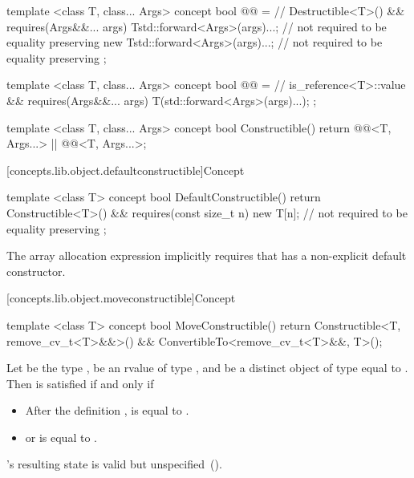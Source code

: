 %
\begin{itemdecl}
template <class T, class... Args>
concept bool @@ = // \expos
  Destructible<T>() && requires(Args&&... args) {
    T{std::forward<Args>(args)...}; // not required to be equality preserving
    new T{std::forward<Args>(args)...}; // not required to be equality preserving
  };

template <class T, class... Args>
concept bool @@ = // \expos
  is_reference<T>::value && requires(Args&&... args) {
    T(std::forward<Args>(args)...);
  };

template <class T, class... Args>
concept bool Constructible() {
  return @@<T, Args...> ||
    @@<T, Args...>;
}
\end{itemdecl}

[concepts.lib.object.defaultconstructible]{Concept }

%
\begin{itemdecl}
template <class T>
concept bool DefaultConstructible() {
  return Constructible<T>() &&
    requires(const size_t n) {
      new T[n]{}; // not required to be equality preserving
    };
}
\end{itemdecl}

\pnum
\enternote The array allocation expression  implicitly
requires that  has a non-explicit default constructor. \exitnote

[concepts.lib.object.moveconstructible]{Concept }

%
\begin{itemdecl}
template <class T>
concept bool MoveConstructible() {
  return Constructible<T, remove_cv_t<T>&&>() &&
    ConvertibleTo<remove_cv_t<T>&&, T>();
}
\end{itemdecl}

\begin{itemdescr}
\pnum
Let  be the type ,
 be an rvalue of type ,
and  be a distinct object of type  equal to .
Then  is satisfied if and only if

\begin{itemize}
\item After the definition ,  is equal to .
\item {} or  is equal to .
\end{itemize}

\pnum
{}'s resulting state is valid but unspecified~().

\end{itemdescr}


